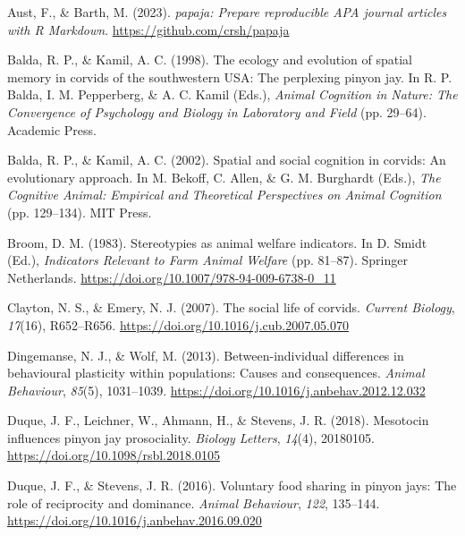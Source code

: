 \documentclass[
  pub]{apa6}
\newlength{\cslhangindent}
\newlength{\cslentryspacingunit} %
\newenvironment{CSLReferences}[2] %
 {%
  \setlength{\parindent}{0pt}
  \ifodd #1
  \let\oldpar\par
  \def\par{\hangindent=\cslhangindent\oldpar}
  \fi
  \setlength{\parskip}{#2\cslentryspacingunit}
 }%
 {}
\begin{document}
\hypertarget{refs}{}
\begin{CSLReferences}{1}{0}
\leavevmode{}%
Aust, F., \& Barth, M. (2023). \emph{{papaja}: {Prepare} reproducible {APA} journal articles with {R Markdown}}. \url{https://github.com/crsh/papaja}

\leavevmode{}%
Balda, R. P., \& Kamil, A. C. (1998). The ecology and evolution of spatial memory in corvids of the southwestern {USA}: {The} perplexing pinyon jay. In R. P. Balda, I. M. Pepperberg, \& A. C. Kamil (Eds.), \emph{Animal {Cognition} in {Nature}: {The Convergence} of {Psychology} and {Biology} in {Laboratory} and {Field}} (pp. 29--64). {Academic Press}.

\leavevmode{}%
Balda, R. P., \& Kamil, A. C. (2002). Spatial and social cognition in corvids: An evolutionary approach. In M. Bekoff, C. Allen, \& G. M. Burghardt (Eds.), \emph{The {Cognitive Animal}: {Empirical} and {Theoretical Perspectives} on {Animal Cognition}} (pp. 129--134). {MIT Press}.

\leavevmode{}%
Broom, D. M. (1983). Stereotypies as animal welfare indicators. In D. Smidt (Ed.), \emph{Indicators {Relevant} to {Farm Animal Welfare}} (pp. 81--87). {Springer Netherlands}. \url{https://doi.org/10.1007/978-94-009-6738-0_11}

\leavevmode{}%
Clayton, N. S., \& Emery, N. J. (2007). The social life of corvids. \emph{Current Biology}, \emph{17}(16), R652--R656. \url{https://doi.org/10.1016/j.cub.2007.05.070}

\leavevmode{}%
Dingemanse, N. J., \& Wolf, M. (2013). Between-individual differences in behavioural plasticity within populations: Causes and consequences. \emph{Animal Behaviour}, \emph{85}(5), 1031--1039. \url{https://doi.org/10.1016/j.anbehav.2012.12.032}

\leavevmode{}%
Duque, J. F., Leichner, W., Ahmann, H., \& Stevens, J. R. (2018). Mesotocin influences pinyon jay prosociality. \emph{Biology Letters}, \emph{14}(4), 20180105. \url{https://doi.org/10.1098/rsbl.2018.0105}

\leavevmode{}%
Duque, J. F., \& Stevens, J. R. (2016). Voluntary food sharing in pinyon jays: The role of reciprocity and dominance. \emph{Animal Behaviour}, \emph{122}, 135--144. \url{https://doi.org/10.1016/j.anbehav.2016.09.020}


\end{CSLReferences}
\end{document}
